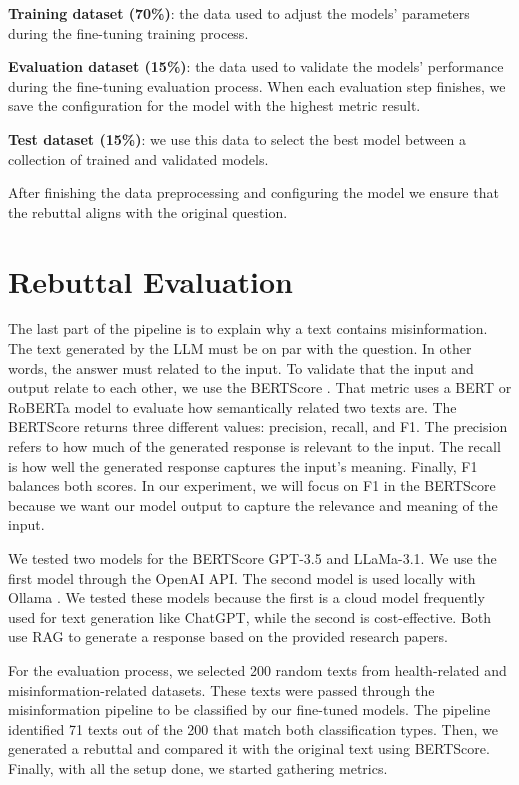 \begin{description}
\item{\textbf{Training dataset (70\%)}}: the data used to adjust the models' parameters during the fine-tuning training process.
\item{\textbf{Evaluation dataset (15\%)}}: the data used to validate the models' performance during the fine-tuning evaluation process. When each evaluation step finishes, we save the configuration for the model with the highest metric result. 
\item{\textbf{Test dataset (15\%)}}: we use this data to select the best model between a collection of trained and validated models.

\end{description}

After finishing the data preprocessing and configuring the model we ensure that the rebuttal aligns with the original question. 

\section{Rebuttal Evaluation}
The last part of the pipeline is to explain why a text contains misinformation. The text generated by the LLM must be on par with the question. In other words, the answer must related to the input. To validate that the input and output relate to each other, we use the BERTScore
\cite{zhang2020bertscoreevaluatingtextgeneration}. That metric uses a BERT or RoBERTa model to evaluate how semantically related two texts are. The BERTScore returns three different values: precision, recall, and F1. The precision refers to how much of the generated response is relevant to the input. The recall is how well the generated response captures the input’s meaning. Finally, F1 balances both scores. In our experiment, we will focus on F1 in the BERTScore because we want our model output to capture the relevance and meaning of the input.

We tested two models for the BERTScore GPT-3.5 and LLaMa-3.1. We use the first model through the OpenAI \cite{openai} API. The second model is used locally with Ollama \cite{ollama}. We tested these models because the first is a cloud model frequently used for text generation like ChatGPT, while the second is cost-effective. Both use RAG to generate a response based on the provided research papers.

For the evaluation process, we selected 200 random texts from health-related and misinformation-related datasets. These texts were passed through the misinformation pipeline to be classified by our fine-tuned models. The pipeline identified 71 texts out of the 200 that match both classification types. Then, we generated a rebuttal and compared it with the original text using BERTScore. Finally, with all the setup done, we started gathering metrics.










